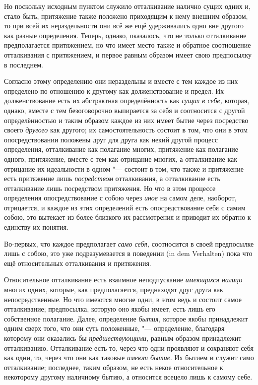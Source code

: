 Но поскольку исходным пунктом служило отталкивание налично сущих одних и,
стало быть, притяжение также положено приходящим к нему внешним образом, то
при всей их нераздельности они всё же ещё удерживались одно вне другого как
разные определения. Теперь, однако, оказалось, что не только отталкивание
предполагается притяжением, но что имеет место также и обратное соотношение
отталкивания с притяжением, и первое равным образом имеет свою предпосылку
в последнем.

Согласно этому определению они нераздельны и вместе с тем каждое из них
определено по отношению к другому как долженствование и предел. Их
долженствование есть их абстрактная определённость как
{\em сущих в себе,} которая, однако, вместе с тем
безоговорочно выпирается за себя и соотносится с другой определённостью и
таким образом каждое из них имеет бытие через посредство своего
{\em другого} как другого; их самостоятельность состоит
в том, что они в этом опосредствовании положены друг для друга как некий
другой процесс определения, отталкивание как полагание многих, притяжение
как полагание одного, притяжение, вместе с тем как отрицание многих, а
отталкивание как отрицание их идеальности в одном "--- состоит в том, что
также и притяжение есть притяжение лишь
{\em посредством} отталкивания, а отталкивание есть
отталкивание лишь посредством притяжения. Но что в этом процессе
определения опосредствование с собою через {\em иное}
на самом деле, наоборот, отрицается, и каждое из этих определений есть
опосредствование себя с самим собою, это вытекает из более близкого их
рассмотрения и приводит их обратно к единству их понятия.

Во-первых, что каждое предполагает {\em само себя,} соотносится в своей
предпосылке лишь с собою, это уже подразумевается в поведении
(in dem Verhalten) пока что ещё относительных отталкивания и притяжения.

Относительное отталкивание есть взаимное неподпускание
{\em имеющихся налицо} многих одних, которые, как
предполагается, преднаходят друг друга как непосредственные. Но что имеются
многие одни, в этом ведь и состоит самое отталкивание; предпосылка, которую
оно якобы имеет, есть лишь его собственное полагание. Далее, определение
{\em бытия,} которое якобы принадлежит одним сверх
того, что они суть положенные, "--- определение, благодаря которому они
оказались бы {\em предшествующими,} равным образом
принадлежит отталкиванию. Отталкивание есть то, через что одни проявляют и
сохраняют себя как одни, то, через что они как таковые
{\em имеют бытие}. Их бытием и служит само
отталкивание; последнее, таким образом, не есть некое относительное к
некоторому другому наличному бытию, а относится всецело лишь к самому себе.

